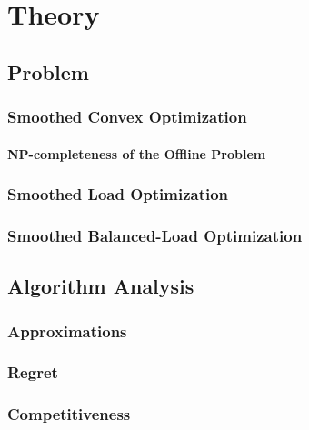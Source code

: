 
\chapter{Theory}\label{chapter:theory}

\section{Problem}

\subsection{Smoothed Convex Optimization}

\subsubsection{NP-completeness of the Offline Problem}

\subsection{Smoothed Load Optimization}

\subsection{Smoothed Balanced-Load Optimization}

\section{Algorithm Analysis}

\subsection{Approximations}

\subsection{Regret}

\subsection{Competitiveness}
